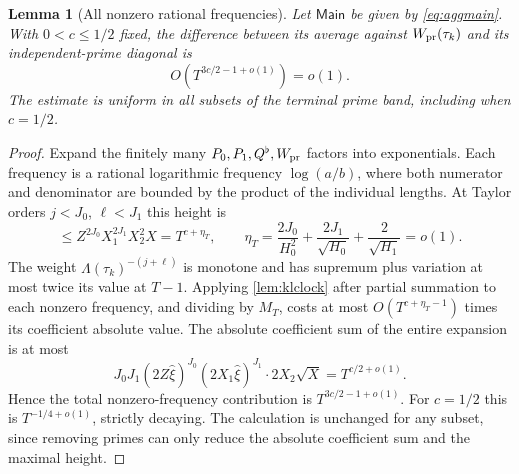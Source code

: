 \documentclass[11pt,reqno]{amsart}
\numberwithin{equation}{section}
\newtheorem{lemma}[theorem]{Lemma}
\begin{document}
\begin{lemma}[All nonzero rational frequencies]\label{lem:aggoffdiag}
Let $\mathsf{Main}$ be given by \eqref{eq:aggmain}.
With $0<c\le1/2$ fixed, the difference between its average
against $W_{\rm pr}(\tau_k)$ and its independent-prime diagonal is
\begin{equation}\label{eq:aggoffdiag}
O\left(T^{3c/2-1+o(1)}\right)=o(1).
\end{equation}
The estimate is uniform in all subsets of the terminal prime band,
including when $c=1/2$.
\end{lemma}
\begin{proof}
Expand the finitely many $P_0,P_1,Q^\flat,W_{\rm pr}$
factors into exponentials.  Each frequency is a rational
logarithmic frequency $\log(a/b)$, where both numerator and
denominator are bounded by the product of the individual
lengths.  At Taylor orders $j<J_0$, $\ell<J_1$ this height is
\[
\le Z^{2J_0}X_1^{2J_1}X_2^2X
 =T^{c+\eta_T},\qquad
\eta_T=\frac{2J_0}{H_0^2}+
\frac{2J_1}{\sqrt{H_0}}+\frac2{\sqrt{H_1}}=o(1).
\]
The weight $\Lambda(\tau_k)^{-(j+\ell)}$ is monotone
and has supremum plus variation at most twice its value at
$T-1$.  Applying \cref{lem:klclock} after partial summation
to each nonzero frequency, and dividing by $M_T$, costs at most
$O(T^{c+\eta_T-1})$ times its coefficient absolute value.
The absolute coefficient sum of the entire expansion is at most
\[
J_0J_1(2Z\widehat\xi)^{J_0}
 (2X_1\widehat\xi)^{J_1}
 \cdot 2X_2\sqrt X=T^{c/2+o(1)}.
\]
Hence the total nonzero-frequency contribution is
$T^{3c/2-1+o(1)}$.  For $c=1/2$ this is
$T^{-1/4+o(1)}$, strictly decaying.  The calculation is unchanged
for any subset, since removing primes can only reduce the
absolute coefficient sum and the maximal height.
\end{proof}
\end{document}
